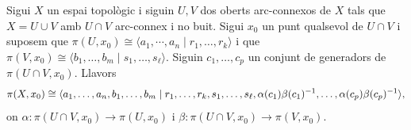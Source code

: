 \documentclass[../main.tex]{subfiles}
\begin{document}
\begin{ter}
\label{ter:seifertvankampen} Sigui $X$ un espai topològic i siguin $U,V$ dos oberts arc-connexos de $X$ tals que $X = U\cup V$ amb $U\cap V$ arc-connex i no buit. Sigui $x_0$ un punt qualsevol de $U\cap V$ i suposem que $\pi(U,x_0)\cong \langle a_1,\cdots,a_n\mid r_1,\ldots,r_k\rangle$ i que $\pi(V,x_0)\cong \langle b_1,\ldots,b_m\mid s_1,\ldots,s_\ell\rangle$. Siguin $c_1,\ldots,c_p$ un conjunt de generadors de $\pi(U\cap V,x_0)$. Llavors
\begin{equation}
    \notag
    \pi(X,x_0)\cong \langle a_1,\ldots,a_n,b_1,\ldots,b_m\mid r_1,\ldots,r_k,s_1,\ldots,s_\ell,\alpha(c_1)\beta(c_1)^{-1},\ldots,\alpha(c_p)\beta(c_p)^{-1}\rangle,
\end{equation}
on $\alpha:\pi(U\cap V,x_0)\rightarrow \pi(U,x_0)$ i $\beta:\pi(U\cap V,x_0)\rightarrow \pi(V,x_0)$.
\end{ter}
\end{document}
